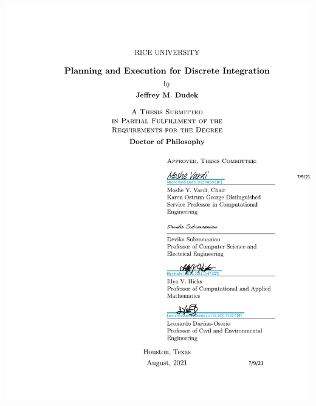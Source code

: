 \documentclass[12pt]{sty/ruthesis}
\begin{document}
\begin{frontmatter}
\begin{textblock}{80}
   	\includegraphics[page=1,clip,trim=110mm 58.7mm 10mm 210mm]{coverpage.pdf}
   \end{textblock}
   
   \maketitle
   
   
   
   \tableofcontents
   \listoffigures
   \listoftables
  \end{frontmatter}










\appendix

%
%
%
%



\end{document}
